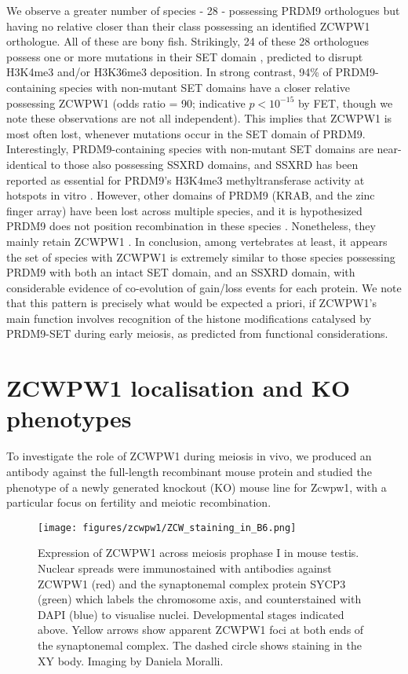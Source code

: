 We observe a greater number of species - 28 - possessing PRDM9 orthologues but having no relative closer than their class possessing an identified ZCWPW1 orthologue. All of these are bony fish. Strikingly, 24 of these 28 orthologues possess one or more mutations in their SET domain \iffalse supp table \fi, predicted to disrupt H3K4me3 and/or H3K36me3 deposition. In strong contrast, 94\% of PRDM9-containing species with non-mutant SET domains have a closer relative possessing ZCWPW1 (odds ratio = 90; indicative $p < 10^{-15}$ by FET, though we note these observations are not all independent). This implies that ZCWPW1 is most often lost, whenever mutations occur in the SET domain of PRDM9. Interestingly, PRDM9-containing species with non-mutant SET domains are near-identical to those also possessing SSXRD domains, and SSXRD has been reported as essential for PRDM9’s H3K4me3 methyltransferase activity at hotspots in vitro \parencite{Thibault-Sennett2018Interrogating}. However, other domains of PRDM9 (KRAB, and the zinc finger array) have been lost across multiple species, and it is hypothesized PRDM9 does not position recombination in these species \parencite{Baker2017Repeated}. Nonetheless, they mainly retain ZCWPW1 \iffalse supp table \fi. In conclusion, among vertebrates at least, it appears the set of species with ZCWPW1 is extremely similar to those species possessing PRDM9 with both an intact SET domain, and an SSXRD domain, with considerable evidence of co-evolution of gain/loss events for each protein. We note that this pattern is precisely what would be expected a priori, if ZCWPW1’s main function involves recognition of the histone modifications catalysed by PRDM9-SET during early meiosis, as predicted from functional considerations.

\section{ZCWPW1 localisation and  KO phenotypes} %
To investigate the role of ZCWPW1 during meiosis in vivo, we produced an antibody against the full-length recombinant mouse protein \iffalse supp fig 2 \fi and studied the phenotype of a newly generated knockout (KO) mouse line for Zcwpw1, with a particular focus on fertility and meiotic recombination.

\begin{figure}[H]
	\centering
	\texttt{[image: figures/zcwpw1/ZCW\_staining\_in\_B6.png]}
	\caption[Zcwpw1 Expression]{
		Expression of ZCWPW1 across meiosis prophase I in mouse testis. Nuclear spreads were immunostained with antibodies against ZCWPW1 (red) and the synaptonemal complex protein SYCP3 (green) which labels the chromosome axis, and counterstained with DAPI (blue) to visualise nuclei. Developmental stages indicated above. Yellow arrows show apparent ZCWPW1 foci at both ends of the synaptonemal complex. The dashed circle shows staining in the XY body. Imaging by Daniela Moralli.
	}
	\label{fig:ZCWPW1_expression}
\end{figure}

